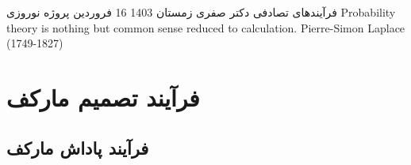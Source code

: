 \documentclass[12pt]{article}
\begin{document}
	\pagestyle{empty}
	\heading
	{
		فرآیندهای تصادفی
	}
	{
		دکتر صفری
	}
	{زمستان 1403}
	{16 فروردین}
	{
		پروژه نوروزی
	}
	\inspiringQuotation
	{Probability theory is nothing but common sense reduced to calculation. }
	{Pierre-Simon Laplace (1749-1827)}
	


    \section{فرآیند تصمیم مارکف}
    \subsection{فرآیند پاداش مارکف}
\end{document}

